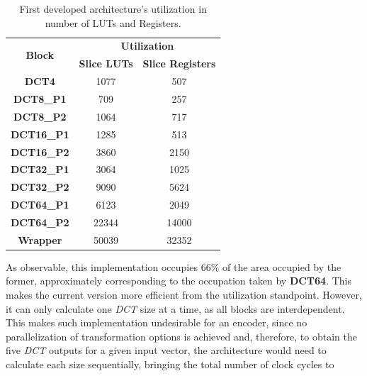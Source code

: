 \begin{table}[!htpb]
    \centering
    \caption{First developed architecture’s utilization in number of LUTs and Registers.}
    \begin{tabular}{ccc} \toprule
        \multirow{2}{*}{\textbf{Block}}     & \multicolumn{2}{c}{\textbf{Utilization}}              \\
                                            & \textbf{Slice LUTs}      & \textbf{Slice Registers}   \\ \toprule
        \textbf{DCT4}                       & 1077                     & 507    \\
        \textbf{DCT8\_P1}                   & 709                      & 257    \\
        \textbf{DCT8\_P2}                   & 1064                     & 717    \\
        \textbf{DCT16\_P1}                  & 1285                     & 513    \\
        \textbf{DCT16\_P2}                  & 3860                     & 2150   \\
        \textbf{DCT32\_P1}                  & 3064                     & 1025   \\
        \textbf{DCT32\_P2}                  & 9090                     & 5624   \\
        \textbf{DCT64\_P1}                  & 6123                     & 2049   \\
        \textbf{DCT64\_P2}                  & 22344                    & 14000  \\ \bottomrule
        \textbf{Wrapper}                    & 50039                    & 32352  \\
        \bottomrule
    \end{tabular}    
    \label{tab:v2results}
\end{table}

As observable, this implementation occupies $66\%$ of the area occupied by the former, approximately corresponding to the occupation taken by \textbf{DCT64}. This makes the current version more efficient from the utilization standpoint. However, it can only calculate one \emph{DCT} size at a time, as all blocks are interdependent. This makes such implementation undesirable for an encoder, since no parallelization of transformation options is achieved and, therefore, to obtain the five \emph{DCT} outputs for a given input vector, the architecture would need to calculate each size sequentially, bringing the total number of clock cycles to

